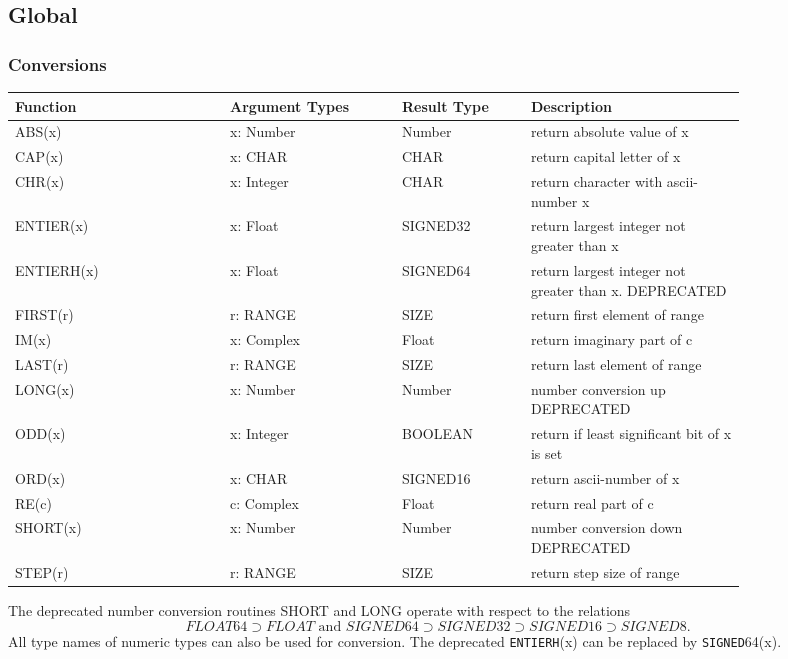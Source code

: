 \documentclass[a4wide,11pt]{article}
\newcommand{\SIGNED}{\lstinline"SIGNED"}
\newcommand{\ENTIERH}{\lstinline"ENTIERH"}
\begin{document}
\subsection{Global}
\subsubsection{Conversions}
\begin{longtable}{|p{0.25\linewidth}|p{0.2\linewidth}|p{0.15\linewidth}|p{0.25\linewidth}|}
\hline
Function & Argument Types & Result Type & Description \\
\hline\hline
\endhead
ABS(x) & x: Number & Number & return absolute value of x\\
CAP(x) & x: CHAR & CHAR & return capital letter of x\\
CHR(x) & x: Integer & CHAR & return character with ascii-number x\\
ENTIER(x) & x: Float & SIGNED32 & return largest integer not greater than x\\
ENTIERH(x) & x: Float & SIGNED64 & return largest integer not greater than x. DEPRECATED\\
FIRST(r) & r: RANGE & SIZE & return first element of range \\
IM(x) & x: Complex & Float & return imaginary part of c \\
LAST(r) & r: RANGE & SIZE & return last element of range \\
LONG(x) & x: Number & Number & number conversion up DEPRECATED \\
ODD(x) & x: Integer & BOOLEAN & return if least significant bit of x is set\\
ORD(x) & x: CHAR & SIGNED16 & return ascii-number of x\\
RE(c) & c: Complex & Float & return real part of c \\
SHORT(x) & x: Number & Number & number conversion down DEPRECATED \\
STEP(r) & r: RANGE & SIZE & return step size of range \\
\hline
\end{longtable}

The deprecated number conversion routines SHORT and LONG operate with respect to the relations
$$FLOAT64 \supset FLOAT \mbox{ and } SIGNED64 \supset SIGNED32 \supset SIGNED16 \supset SIGNED8.$$
All type names of numeric types can also be used for conversion.
The deprecated \ENTIERH(x) can be replaced by \SIGNED64(x).
\end{document}
